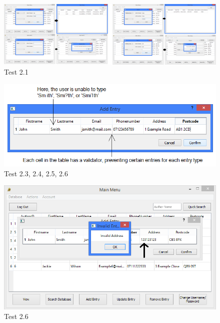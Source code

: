 \begin{landscape}
\begin{figure}[H]
    \includegraphics[width=\textwidth]{./Testing/Evidence/Series2/SearchValidation.png}
    \caption{Test 2.1}  \label{fig:SearchValidation}
\end{figure}


\begin{figure}[H]
    \includegraphics[width=\textwidth]{./Testing/Evidence/Series2/AddEntryValidation.png}
    \caption{Test 2.3, 2.4, 2.5, 2.6}  \label{fig:AddEntryValidation}
\end{figure}

\begin{figure}[H]
    \includegraphics[width=\textwidth]{./Testing/Evidence/Series2/InvalidAddress.png}
    \caption{Test 2.6}  \label{fig:InvalidAddress}
\end{figure}


\end{landscape}
